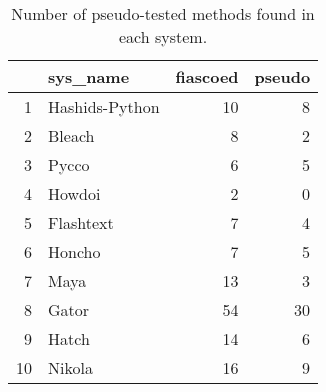 \begin{table}[H]
\centering
\begin{tabular}{rlrr}
  \hline
 & sys\_name & fiascoed & pseudo \\
  \hline
1 & Hashids-Python &  10 &   8 \\
  2 & Bleach &   8 &   2 \\
  3 & Pycco &   6 &   5 \\
  4 & Howdoi &   2 &   0 \\
  5 & Flashtext &   7 &   4 \\
  6 & Honcho &   7 &   5 \\
  7 & Maya &  13 &   3 \\
  8 & Gator &  54 &  30 \\
  9 & Hatch &  14 &   6 \\
  10 & Nikola &  16 &   9 \\
   \hline
\end{tabular}
\caption{Number of pseudo-tested methods found in each system.}~\label{pseudoFound}
\end{table}
